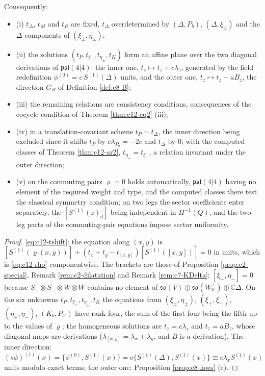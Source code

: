 \begin{theorem}
Consequently:
\begin{itemize}
\item (i) $t_\Delta$, $t_M$ and $t_R$ are fixed, $t_\Delta$ overdetermined by $(\Delta,P_b)$, $(\Delta,\xi_\pm)$ and the $\Delta$-components of $(\xi_\pm,\eta_\pm)$;
\item (ii) the solutions $(t_P,t_{\xi_\pm},t_{\eta_\pm},t_K)$ form an affine plane over the two diagonal derivations of $\mathfrak{psl}(4|4)$: the inner one, $t_z\mapsto t_z+c\lambda_z$, generated by the field redefinition $\phi^{(0)}=c\,S^{(1)}(\Delta)$ units, and the outer one, $t_z\mapsto t_z+aB_z$, the direction $G_B$ of Definition \ref{def:c8-B};
\item (iii) the remaining relations are consistency conditions, consequences of the cocycle condition of Theorem \ref{thm:c12-eq2} (iii);
\item (iv) in a translation-covariant scheme $t_P=t_\Delta$, the inner direction being excluded since it shifts $t_P$ by $c\lambda_{P_b}=-2c$ and $t_\Delta$ by $0$; with the computed classes of Theorem \ref{thm:c12-ar2}, $t_{\eta_+}=t_{\xi_-}$, a relation invariant under the outer direction;
\item (v) on the commuting pairs $\varrho=0$ holds automatically, $\mathfrak{psl}(4|4)$ having no element of the required weight and type, and the computed classes there test the classical symmetry condition; on two legs the sector coefficients enter separately, the $[S^{(1)}(z)_d]$ being independent in $H^{-1}(Q)$, and the two-leg parts of the commuting-pair equations impose sector uniformity.
\end{itemize}
\end{theorem}

\begin{proof}
\eqref{eq:c12-tshift}: the equation along $(x,y)$ is $[S^{(1)}(\varrho(x,y))]+(t_x+t_y-t_{[x,y]})[S^{(1)}([x,y])]=0$ in units, which is \eqref{eq:c12-rho} componentwise. The brackets are those of Proposition \ref{prop:c2-special}, Remark \ref{rem:c2-dilatation} and Remark \ref{rem:c7-KDelta}; $[\xi_+,\eta_-]=0$ because $S_+\otimes S_-\otimes W\otimes W$ contains no element of $\mathfrak{so}(V)\oplus\mathfrak{so}(W_{\mathbb R}^\perp)\oplus\mathbb C\Delta$. On the six unknowns $t_P,t_{\xi_\pm},t_{\eta_\pm},t_K$ the equations from $(\xi_\pm,\eta_\pm)$, $(\xi_+,\xi_-)$, $(\eta_+,\eta_-)$, $(K_b,P_{b'})$ have rank four, the sum of the first four being the fifth up to the values of $\varrho$; the homogeneous solutions are $t_z=c\lambda_z$ and $t_z=aB_z$, whose diagonal maps are derivations ($\lambda_{[x,y]}=\lambda_x+\lambda_y$, and $B$ is a derivation). The inner direction: $(s\phi)^{(1)}(x)=\{\phi^{(0)},S^{(1)}(x)\}=c\{S^{(1)}(\Delta),S^{(1)}(x)\}\equiv c\lambda_xS^{(1)}(x)$ units modulo exact terms; the outer one: Proposition \ref{prop:c8-laws} (c).
\end{proof}

